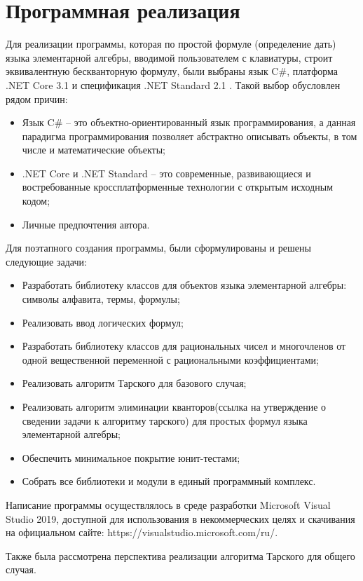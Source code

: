 \section{Программная реализация}

Для реализации программы, которая по простой формуле (определение дать) языка элементарной алгебры, вводимой пользователем с клавиатуры, строит эквивалентную бескванторную формулу, были выбраны язык C\#, платформа .NET Core 3.1 и спецификация .NET Standard 2.1 \cite{TroelsonNet}. Такой выбор обусловлен рядом причин:
\begin{itemize}
    \item Язык C\# -- это объектно-ориентированный язык программирования, а данная парадигма программирования позволяет абстрактно описывать объекты, в том числе и математические объекты; 
    \item .NET Core и .NET Standard -- это современные, развивающиеся и востребованные кроссплатформенные технологии с открытым исходным кодом;
    \item Личные предпочтения автора.
\end{itemize}
Для поэтапного создания программы, были сформулированы и решены следующие задачи:
\begin{itemize}
    \item Разработать библиотеку классов для объектов языка элементарной алгебры: символы алфавита, термы, формулы;
    \item Реализовать ввод логических формул;
    \item Разработать библиотеку классов для рациональных чисел и многочленов от одной вещественной переменной с рациональными коэффициентами;
    \item Реализовать алгоритм Тарского для базового случая;
    \item Реализовать алгоритм элиминации кванторов(ссылка на утверждение о сведении задачи к алгоритму тарского) для простых формул языка элементарной алгебры;
    \item Обеспечить минимальное покрытие юнит-тестами;
    \item Собрать все библиотеки и модули в единый программный комплекс.
\end{itemize}
Написание программы осуществлялось в среде разработки Microsoft Visual Studio 2019, доступной для использования в некоммерческих целях и скачивания на официальном сайте: https://visualstudio.microsoft.com/ru/.

Также была рассмотрена перспектива реализации алгоритма Тарского для общего случая. 

